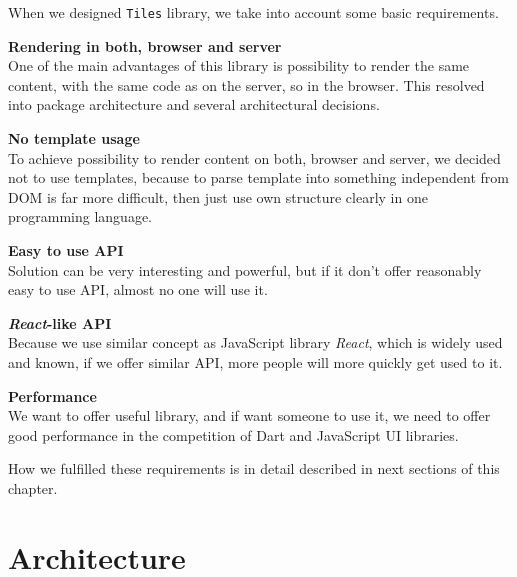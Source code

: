 \documentclass[oneside, 12pt]{book}
\begin{document}
  When we designed \texttt{Tiles} library, we take into account some basic requirements. 
  \begin{description}
    \item{\textbf{Rendering in both, browser and server}} \hfill \\
      One of the main advantages of this library is possibility to render the same content, 
      with the same code as on the server, so in the browser.
      This resolved into package architecture and several architectural decisions.
      \begin{description}
        \item{\textbf{No template usage}} \hfill \\
          To achieve possibility to render content on both, browser and server, 
          we decided not to use templates, 
          because to parse template into something independent from DOM is far more difficult,
          then just use own structure clearly in one programming language.
      \end{description}
    \item{\textbf{Easy to use API}} \hfill \\
      Solution can be very interesting and powerful, 
      but if it don't offer reasonably easy to use API, almost no one will use it.
      \begin{description}
				\item{\textbf{\textit{React}-like API}} \hfill \\
					Because we use similar concept as JavaScript library \textit{React},  
          which is widely used and known, 
          if we offer similar API, more people will more quickly get used to it.
      \end{description}
    \item{\textbf{Performance}} \hfill \\
      We want to offer useful library, and if want someone to use it, 
      we need to offer good performance in the competition of Dart and JavaScript UI libraries.
  \end{description}

  How we fulfilled these requirements is in detail described in next sections of this chapter.

\section{Architecture}\label{sec:our-architecture}
\end{document}
